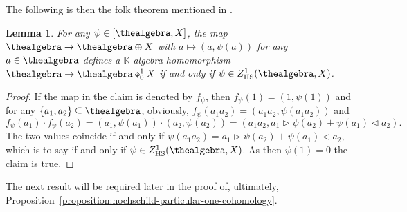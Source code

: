 \documentclass[10pt,a4paper]{amsart}
\numberwithin{equation}{section}
\newtheorem{Lemma}[Theorem]{Lemma}
\newcommand{\diamondplus}{\mathbin{\ooalign{\hfil$\diamond$\hfil\cr\hfil$\scriptscriptstyle+$\hfil\cr}}}
\newcommand{\HSalgebraconstructdeform}[4]{#2\diamondplus^{#1}_{#4}#3}
\newcommand{\HScocycles}[3]{Z^{#1}_{\mathrm{HS}}(#2,#3)}
\newcommand{\Smonoidalproduct}{\otimes}
\newcommand{\SinternalhomX}[2]{[#1,#2]}
\newcommand{\fromto}[2]{#1 \to #2}
\newcommand{\Sdirectsum}{\oplus}
\newcommand{\Sleftmoduleaction}{\triangleright}
\newcommand{\Srightmoduleaction}{\triangleleft}
\newcommand{\thefield}{\mathbb{K}}
\newcommand{\themodule}{X}
\begin{document}
{  The following is then  the folk theorem mentioned in \cite[Lem\-ma~1.9]{KyedRaum2017}.

  {
      \newcommand{\thedeform}{c}
  \newcommand{\thedeformxx}[2]{c(#1 \Smonoidalproduct #2)}
  \newcommand{\anyelement}{a}
  \newcommand{\firstelement}{a_1}
      \newcommand{\secondelement}{a_2}
      \newcommand{\thirdelement}{a_3}
    \newcommand{\somefunc}{\psi}
      \begin{Lemma}
    \label{lemma:the-bfg-lemma}
    \newcommand{\somea}{a}
For any $\somefunc\in\SinternalhomX{\thealgebra}{\themodule}$, the map $\fromto{\thealgebra}{\thealgebra\Sdirectsum\themodule}$ with $\somea\mapsto (\somea,\somefunc(\somea))$ for any $\somea\in \thealgebra$ defines a $\thefield$-algebra homomorphism  $\fromto{\thealgebra}{\HSalgebraconstructdeform{1}{\thealgebra}{\themodule}{0}}$ if and only if $\somefunc\in \HScocycles{1}{\thealgebra}{\themodule}$.
    \end{Lemma}
    \begin{proof}
    \newcommand{\somea}[1]{a_{#1}}
    \newcommand{\firsta}{a_{1}}
    \newcommand{\seconda}{a_{2}}
    \newcommand{\themap}{f_\somefunc}
    If the map in the claim is denoted by $\themap$, then  $\themap(1)=(1,\somefunc(1))$ and for any $\{\firsta,\seconda\}\subseteq \thealgebra$, obviously, $\themap(\firsta\seconda)=(\firsta\seconda,\somefunc(\firsta\seconda))$ and
    \[
      \themap(\firsta)\cdot\themap(\seconda)=(\firsta,\somefunc(\firsta))\cdot(\seconda,\somefunc(\seconda))=(\firsta\seconda,\firsta\Sleftmoduleaction\somefunc(\seconda)+\somefunc(\firsta)\Srightmoduleaction\seconda).
    \]
    The two values coincide if and only if $\somefunc(\firsta\seconda)=\firsta\Sleftmoduleaction\somefunc(\seconda)+\somefunc(\firsta)\Srightmoduleaction\seconda$, which is to say if and only if $\somefunc\in \HScocycles{1}{\thealgebra}{\themodule}$. As then $\somefunc(1)=0$ the claim is true.
    \end{proof}
  }

The next result will be required later in the proof of, ultimately, Pro\-po\-si\-tion~\ref{proposition:hochschild-particular-one-cohomology}.

}
\end{document}
